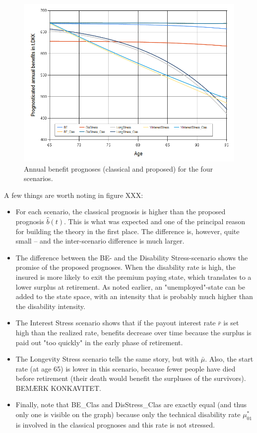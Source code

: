 \documentclass{book}
\newcommand{\1}[1]{\mathbbm{1}_{\left\lbrace #1 \right\rbrace}}
\theoremstyle{break}
\theoremstyle{remark}
\numberwithin{equation}{section}
\begin{document}
\begin{figure}[H]
	\centering
	\caption{Annual benefit prognoses (classical and proposed) for the four scenarios.}
	\includegraphics[width=\textwidth]{Benefits}
\end{figure}

A few things are worth noting in figure XXX:

\begin{itemize}
	\item For each scenario, the classical prognosis is higher than the proposed prognosis $\hat{b}(t)$. This is what was expected and one of the principal reason for building the theory in the first place. The difference is, however, quite small -- and the inter-scenario difference is much larger.
	\item The difference between the BE- and the Disability Stress-scenario shows the promise of the proposed prognoses. When the disability rate is high, the insured is more likely to exit the premium paying state, which translates to a lower surplus at retirement. As noted earlier, an "unemployed"-state can be added to the state space, with an intensity that is probably much higher than the disability intensity.
	\item The Interest Stress scenario shows that if the payout interest rate $\bar{r}$ is set high than the realized rate, benefits decrease over time because the surplus is paid out "too quickly" in the early phase of retirement.
	\item The Longevity Stress scenario tells the same story, but with $\bar{\mu}$. Also, the start rate (at age 65) is lower in this scenario, because fewer people have died before retirement (their death would benefit the surpluses of the survivors). BEMÆRK KONKAVITET.
	\item Finally, note that BE\_Clas and DisStress\_Clas are exactly equal (and thus only one is visible on the graph) because only the technical disability rate $\mu_{01}^*$ is involved in the classical prognoses and this rate is not stressed.
\end{itemize}
\end{document}
